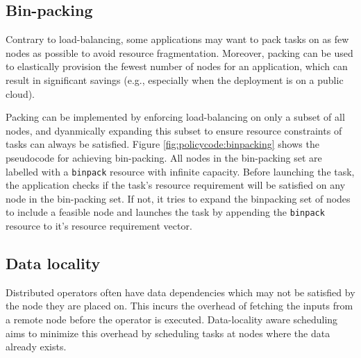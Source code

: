 
\subsection{Bin-packing}
Contrary to load-balancing, some applications may want to pack tasks on as few nodes as possible to avoid resource fragmentation. Moreover, packing can be used to elastically provision the fewest number of nodes for an application, which can result in significant savings (e.g., especially when the deployment is on a public cloud).

Packing can be implemented by enforcing load-balancing on only a subset of all nodes, and dyanmically expanding this subset to ensure resource constraints of tasks can always be satisfied. Figure \ref{fig:policycode:binpacking} shows the pseudocode for achieving bin-packing. All nodes in the bin-packing set are labelled with a \lstinline{binpack} resource with infinite capacity. Before launching the task, the application checks if the task's resource requirement will be satisfied on any node in the bin-packing set. If not, it tries to expand the binpacking set of nodes to include a feasible node and launches the task by appending the \lstinline{binpack} resource to it's resource requirement vector. 



\subsection{Data locality}
Distributed operators often have data dependencies which may not be satisfied by the node they are placed on. This incurs the overhead of fetching the inputs from a remote node before the operator is executed. Data-locality aware scheduling aims to minimize this overhead by scheduling tasks at nodes where the data already exists. 


